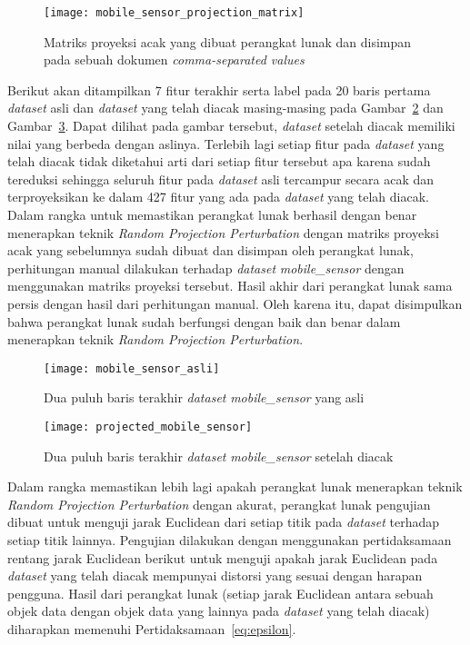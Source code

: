 \begin{figure}
	\centering
	\texttt{[image: mobile\_sensor\_projection\_matrix]}
	\caption{Matriks proyeksi acak yang dibuat perangkat lunak dan disimpan pada sebuah dokumen \textit{comma-separated values}}
	\label{fig:mobile_sensor_projection_matrix}
\end{figure}

Berikut akan ditampilkan 7 fitur terakhir serta label pada 20 baris pertama \textit{dataset} asli dan \textit{dataset} yang telah diacak masing-masing pada Gambar~\ref{fig:mobile_sensor_asli} dan Gambar~\ref{fig:projected_mobile_sensor}. Dapat dilihat pada gambar tersebut, \textit{dataset} setelah diacak memiliki nilai yang berbeda dengan aslinya. Terlebih lagi setiap fitur pada \textit{dataset} yang telah diacak tidak diketahui arti dari setiap fitur tersebut apa karena sudah tereduksi sehingga seluruh fitur pada \textit{dataset} asli tercampur secara acak dan terproyeksikan ke dalam 427 fitur yang ada pada \textit{dataset} yang telah diacak. Dalam rangka untuk memastikan perangkat lunak berhasil dengan benar menerapkan teknik \textit{Random Projection Perturbation} dengan matriks proyeksi acak yang sebelumnya sudah dibuat dan disimpan oleh perangkat lunak, perhitungan manual dilakukan terhadap \textit{dataset} \textit{mobile\_sensor} dengan menggunakan matriks proyeksi tersebut. Hasil akhir dari perangkat lunak sama persis dengan hasil dari perhitungan manual. Oleh karena itu, dapat disimpulkan bahwa perangkat lunak sudah berfungsi dengan baik dan benar dalam menerapkan teknik \textit{Random Projection Perturbation}.

\begin{figure}
	\centering
	\texttt{[image: mobile\_sensor\_asli]}
	\caption{Dua puluh baris terakhir \textit{dataset} \textit{mobile\_sensor} yang asli}
	\label{fig:mobile_sensor_asli}
\end{figure}

\begin{figure}
	\centering
	\texttt{[image: projected\_mobile\_sensor]}
	\caption{Dua puluh baris terakhir \textit{dataset} \textit{mobile\_sensor} setelah diacak}
	\label{fig:projected_mobile_sensor}
\end{figure}

Dalam rangka memastikan lebih lagi apakah perangkat lunak menerapkan teknik \textit{Random Projection Perturbation} dengan akurat, perangkat lunak pengujian dibuat untuk menguji jarak Euclidean dari setiap titik pada \textit{dataset} terhadap setiap titik lainnya. Pengujian dilakukan dengan menggunakan pertidaksamaan rentang jarak Euclidean berikut untuk menguji apakah jarak Euclidean pada \textit{dataset} yang telah diacak mempunyai distorsi yang sesuai dengan harapan pengguna. Hasil dari perangkat lunak (setiap jarak Euclidean antara sebuah objek data dengan objek data yang lainnya pada \textit{dataset} yang telah diacak) diharapkan memenuhi Pertidaksamaan~\ref{eq:epsilon}.


